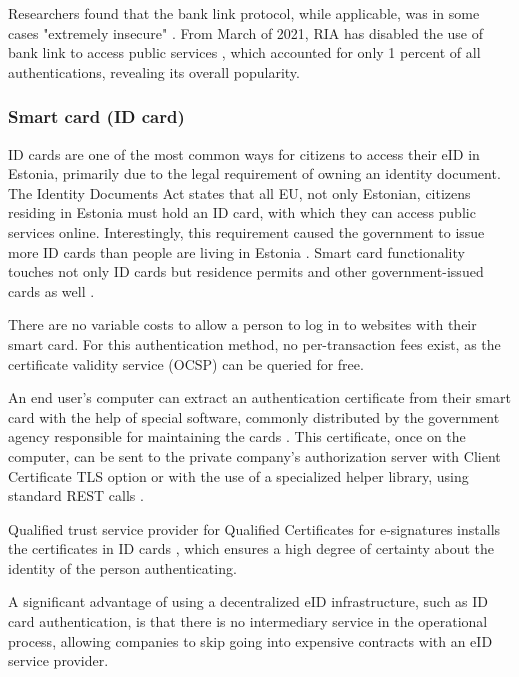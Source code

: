 Researchers found that the bank link protocol, while applicable, was in some cases "extremely insecure" \cite{banklinksecurityanalysis}. From March of 2021, RIA has disabled the use of {bank link} to access public services \cite{ria-deprecates-bank-link}, which accounted for only 1 percent of all authentications, revealing its overall popularity.

\subsubsection{Smart card (ID card)}

ID cards are one of the most common ways for citizens to access their eID in Estonia, primarily due to the legal requirement of owning an identity document. The Identity Documents Act \cite{eelaw-idcard} states that all EU, not only Estonian, citizens residing in Estonia must hold an ID card, with which they can access public services online. Interestingly, this requirement caused the government to issue more ID cards than people are living in Estonia \cite{ria-idee,statee-population}. Smart card functionality touches not only ID cards but residence permits and other government-issued cards as well \cite{eulaw-eidas-notified}.

There are no variable costs to allow a person to log in to websites with their smart card. For this authentication method, no per-transaction fees exist, as the certificate validity service (OCSP) \cite{rfc6960} can be queried for free.

An end user's computer can extract an authentication certificate from their smart card with the help of special software, commonly distributed by the government agency responsible for maintaining the cards \cite{ria-idee}. This certificate, once on the computer, can be sent to the private company's authorization server with Client Certificate TLS option \cite{rfc8446} or with the use of a specialized helper library, using standard REST calls \cite{ria-webeid}.

Qualified trust service provider for Qualified Certificates for e-signatures installs the certificates in ID cards \cite{eu-trustservices}, which ensures a high degree of certainty about the identity of the person authenticating.

A significant advantage of using a decentralized eID infrastructure, such as ID card authentication, is that there is no intermediary service in the operational process, allowing companies to skip going into expensive contracts with an eID service provider.


